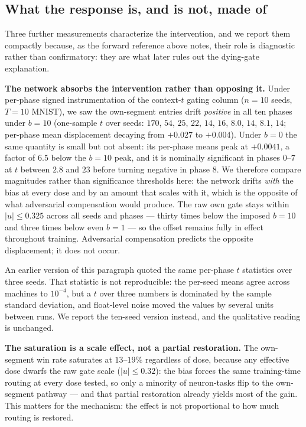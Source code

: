 \documentclass[10pt]{article}
\begin{document}
\subsection{What the response is, and is not, made of}
\label{sec:compact}
\label{sec:compensation}
\label{sec:taskrel}
\label{sec:sigdrift}

Three further measurements characterize the intervention, and we report
them compactly because, as the forward reference above notes, their
role is diagnostic rather than confirmatory: they are what later rules
out the dying-gate explanation.

\textbf{The network absorbs the intervention rather than opposing it.}
Under per-phase signed instrumentation of the context-$t$ gating column
($n=10$ seeds, $T{=}10$ MNIST), we saw the own-segment entries drift
\emph{positive} in all ten phases under $b{=}10$ (one-sample $t$ over
seeds: $170$, $54$, $25$, $22$, $14$, $16$, $8.0$, $14$, $8.1$, $14$;
per-phase mean displacement decaying from $+0.027$ to $+0.004$). Under
$b{=}0$ the same quantity is small but not absent: its per-phase means
peak at $+0.0041$, a factor of $6.5$ below the $b{=}10$ peak, and it is
nominally significant in phases $0$--$7$ at $t$ between $2.8$ and $23$
before turning negative in phase $8$. We therefore compare magnitudes
rather than significance thresholds here: the network drifts \emph{with}
the bias at every dose and by an amount that scales with it, which is
the opposite of what adversarial compensation would produce.
The raw own gate stays within $|u| \le 0.325$ across all seeds and phases
--- thirty times below the imposed $b{=}10$ and three times below even
$b{=}1$ --- so the offset remains fully in effect throughout training.
Adversarial compensation predicts the opposite displacement; it does not
occur.

An earlier version of this paragraph quoted the same per-phase
$t$ statistics over three seeds. That statistic is not reproducible: the
per-seed means agree across machines to $10^{-4}$, but a $t$ over three
numbers is dominated by the sample standard deviation, and float-level
noise moved the values by several units between runs. We report the
ten-seed version instead, and the qualitative reading is unchanged.

\textbf{The saturation is a scale effect, not a partial restoration.} The
own-segment win rate saturates at $13$--$19\%$ regardless of dose,
because any effective dose dwarfs the raw gate scale ($|u|\le 0.32$): the
bias forces the same training-time routing at every dose tested, so only
a minority of neuron-tasks flip to the own-segment pathway --- and that
partial restoration already yields most of the gain. This matters for
the mechanism: the effect is not proportional to how much routing is
restored.
\end{document}

